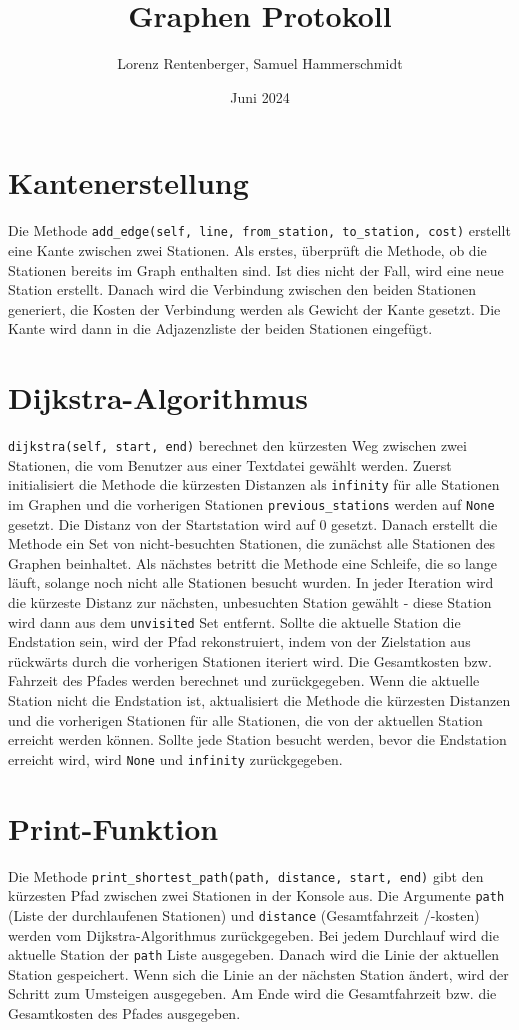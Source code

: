 \documentclass{article}
\title{Graphen Protokoll}
\author{Lorenz Rentenberger, Samuel Hammerschmidt}
\date{Juni 2024}
\begin{document}
\maketitle

\section*{Kantenerstellung}
Die Methode \texttt{add\_edge(self, line, from\_station, to\_station, cost)} erstellt eine Kante zwischen zwei Stationen. Als erstes, überprüft die Methode, ob die Stationen bereits im Graph enthalten sind. Ist dies nicht der Fall, wird eine neue Station erstellt.
Danach wird die Verbindung zwischen den beiden Stationen generiert, die Kosten der Verbindung werden als Gewicht der Kante gesetzt. Die Kante wird dann in die Adjazenzliste der beiden Stationen eingefügt.

\section*{Dijkstra-Algorithmus}
\texttt{dijkstra(self, start, end)} berechnet den kürzesten Weg zwischen zwei Stationen, die vom Benutzer aus einer Textdatei gewählt werden. Zuerst initialisiert die Methode die kürzesten Distanzen als \texttt{infinity} für alle Stationen im Graphen und die vorherigen Stationen \texttt{previous\_stations} werden auf \texttt{None} gesetzt.
Die Distanz von der Startstation wird auf 0 gesetzt. Danach erstellt die Methode ein Set von nicht-besuchten Stationen, die zunächst alle Stationen des Graphen beinhaltet. Als nächstes betritt die Methode eine Schleife, die so lange läuft, solange noch nicht alle Stationen besucht wurden. In jeder Iteration wird die kürzeste Distanz zur nächsten, unbesuchten Station gewählt - diese Station wird dann aus dem \texttt{unvisited} Set entfernt.
Sollte die aktuelle Station die Endstation sein, wird der Pfad rekonstruiert, indem von der Zielstation aus rückwärts durch die vorherigen Stationen iteriert wird. Die Gesamtkosten bzw. Fahrzeit des Pfades werden berechnet und zurückgegeben.
Wenn die aktuelle Station nicht die Endstation ist, aktualisiert die Methode die kürzesten Distanzen und die vorherigen Stationen für alle Stationen, die von der aktuellen Station erreicht werden können. Sollte jede Station besucht werden, bevor die Endstation erreicht wird, wird \texttt{None} und \texttt{infinity} zurückgegeben.

\section*{Print-Funktion}
Die Methode \texttt{print\_shortest\_path(path, distance, start, end)} gibt den kürzesten Pfad zwischen zwei Stationen in der Konsole aus. Die Argumente \texttt{path} (Liste der durchlaufenen Stationen) und \texttt{distance} (Gesamtfahrzeit /-kosten) werden vom Dijkstra-Algorithmus zurückgegeben. Bei jedem Durchlauf wird die aktuelle Station der \texttt{path} Liste ausgegeben. Danach wird die Linie der aktuellen Station gespeichert. Wenn sich die Linie an der nächsten Station ändert, wird der Schritt zum Umsteigen ausgegeben.
Am Ende wird die Gesamtfahrzeit bzw. die Gesamtkosten des Pfades ausgegeben.
\end{document}
